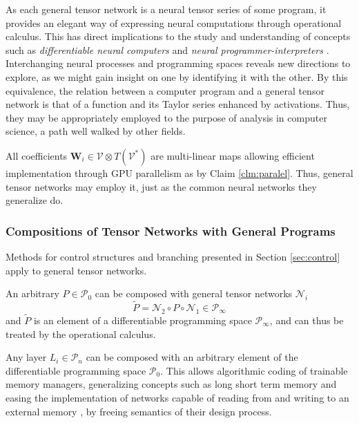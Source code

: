 \documentclass[11pt]{article}
\newcommand{\bfW}{\mathbf{W}}
\newcommand{\VV}{\mathcal{V}}
\newcommand{\NN}{\mathcal{N}}
\newcommand{\dP}{\mathcal{P}}
\begin{document}
As each general tensor network is a neural tensor series of some program, it
provides an elegant way of expressing neural computations through operational
calculus.  
This has direct implications to the study and understanding of concepts such as \emph{differentiable neural computers} \citep{netRam} and \emph{neural programmer-interpreters} \citep{netRam2}. Interchanging neural
processes and programming spaces reveals new directions to explore, as we might
gain insight on one by identifying it with the other. By this equivalence, the relation between a computer program and a general tensor network is that of a function and its Taylor series enhanced by activations. Thus, they may be appropriately employed to the purpose of analysis in computer science, a path well walked by other fields.
 

\begin{remark}
All coefficients $\bfW_i\in \VV\otimes T(\VV^*)$ are multi-linear maps allowing efficient implementation through GPU parallelism as by Claim \ref{clm:paralel}. Thus, general tensor networks may employ it, just as the common neural networks they generalize do.
\end{remark}

\subsubsection{Compositions of Tensor Networks with General Programs}\label{sec:compoNetProg}

Methods for control structures and branching presented in Section
\ref{sec:control} apply to general tensor networks. 
\begin{proposition}\label{clm:composedNet}
An arbitrary $P\in\dP_0$ can be composed with general tensor networks $\NN_i$ 
\begin{equation}\label{eq:composedNet}
\tilde{P}=\NN_2\circ P\circ\NN_1 \in \dP_\infty
\end{equation}
and $\tilde{P}$ is an element of a differentiable programming space $\dP_\infty$, and can thus be treated by the operational calculus. 
\end{proposition}

\begin{remark}
Any layer $L_i\in\dP_n$ can be composed with an arbitrary element of the
differentiable programming space $\dP_0$. This allows algorithmic coding of trainable memory managers, generalizing concepts such as long short term memory \citep{LSTM} and easing the implementation of networks capable of reading from and writing to an external memory \citep{netRam}, by freeing semantics of their design process.
\end{remark}
\end{document}
